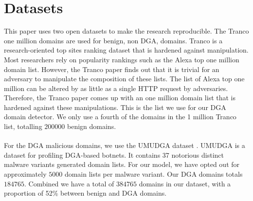 \section{Datasets}
This paper uses two open datasets to make the research reproducible. The Tranco one million domains \cite{Tranco} are used for benign, non DGA, domains. Tranco is a research-oriented top sites ranking dataset that is hardened against manipulation. Most researchers \cite{Antonakakis}\cite{Lison}\cite{Highnam}\cite{TRAN20182401} rely on popularity rankings such as the Alexa top one million domain list. However, the Tranco paper \cite{Tranco} finds out that it is trivial for an adversary to manipulate the composition of these lists. The list of Alexa top one million can be altered by as little as a single HTTP request by adversaries. 
\\
Therefore, the Tranco paper comes up with an one million domain list that is hardened against these manipulations. This is the list we use for our DGA domain detector. We only use a fourth of the domains in the 1 million Tranco list, totalling $200000$ benign domains.\\\\
For the DGA malicious domains, we use the UMUDGA dataset \cite{UMUDGA}. UMUDGA is a dataset for profiling DGA-based botnets. It contains 37 notorious distinct malware variants generated domain lists. For our model, we have opted out for approximately $5000$ domain lists per malware variant. Our DGA domains totals $184765$. Combined we have a total of $384765$ domains in our dataset, with a proportion of 52\% between benign and DGA domains.


